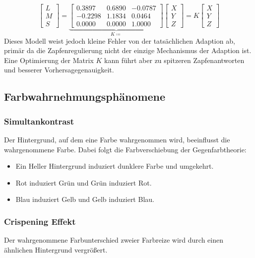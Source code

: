 \documentclass[a4paper, 11pt, accentcolor = tud3b]{tudreport}
\begin{document}
					\begin{equation*}
						\begin{bmatrix}
							L \\
							M \\
							S
						\end{bmatrix}
						=
						\underbrace{
						\begin{bmatrix}
							0.3897  & 0.6890 & -0.0787 \\
							-0.2298 & 1.1834 & 0.0464  \\
							0.0000  & 0.0000 & 1.0000
						\end{bmatrix}
						}_{K \coloneqq}
						\begin{bmatrix}
							X \\
							Y \\
							Z
						\end{bmatrix}
						= K
						\begin{bmatrix}
							X \\
							Y \\
							Z
						\end{bmatrix}
					\end{equation*}
					Dieses Modell weist jedoch kleine Fehler von der tatsächlichen Adaption ab, primär da die Zapfenregulierung nicht der einzige Mechanismus der Adaption ist. Eine Optimierung der Matrix \(K\) kann führt aber zu spitzeren Zapfenantworten und besserer Vorhersagegenauigkeit.

			\subsection{Farbwahrnehmungsphänomene}
				\subsubsection{Simultankontrast}
					Der Hintergrund, auf dem eine Farbe wahrgenommen wird, beeinflusst die wahrgenommene Farbe. Dabei folgt die Farbverschiebung der Gegenfarbtheorie:
					\begin{itemize}
						\item Ein Heller Hintergrund induziert dunklere Farbe und umgekehrt.
						\item Rot induziert Grün und Grün induziert Rot.
						\item Blau induziert Gelb und Gelb induziert Blau.
					\end{itemize}

				\subsubsection{Crispening Effekt}
					Der wahrgenommene Farbunterschied zweier Farbreize wird durch einen ähnlichen Hintergrund vergrößert.
\end{document}
